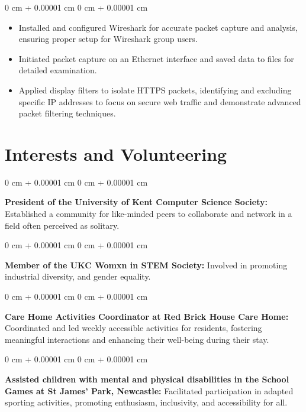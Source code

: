 \documentclass[10pt, letterpaper]{article}
\newenvironment{highlights}{
    \begin{itemize}[
        topsep=0.10 cm,
        parsep=0.10 cm,
        partopsep=0pt,
        itemsep=0pt,
        leftmargin=0 cm + 10pt
    ]
}{
    \end{itemize}
} %
\newenvironment{onecolentry}{
    \begin{adjustwidth}{
        0 cm + 0.00001 cm
    }{
        0 cm + 0.00001 cm
    }
}{
    \end{adjustwidth}
} %
\begin{document}
        \vspace{0.05 cm}
        \begin{onecolentry}
            \begin{highlights}
                \item Installed and configured Wireshark for accurate packet capture and analysis, ensuring proper setup for Wireshark group users.
                \item Initiated packet capture on an Ethernet interface and saved data to files for detailed examination.
                \item Applied display filters to isolate HTTPS packets, identifying and excluding specific IP addresses to focus on secure web traffic and demonstrate advanced packet filtering techniques.
            \end{highlights}
        \end{onecolentry}
   

 \section{Interests and Volunteering}
        
        \begin{onecolentry}
            \textbf{President of the University of Kent Computer Science Society:} Established a community for like-minded peers to collaborate and network in a field often perceived as solitary.
        \end{onecolentry}

        \vspace{0.05 cm}
        \begin{onecolentry}
            \textbf{Member of the UKC Womxn in STEM Society:} Involved in promoting industrial diversity, and gender equality.
        \end{onecolentry}

        \vspace{0.05 cm}

        \begin{onecolentry}
            \textbf{Care Home Activities Coordinator at Red Brick House Care Home:} Coordinated and led weekly accessible activities for residents, fostering meaningful interactions and enhancing their well-being during their stay. 
        \end{onecolentry}
         \vspace{0.05 cm}

        \begin{onecolentry}
            \textbf{Assisted children with mental and physical disabilities in the School Games at St James’ Park, Newcastle:} Facilitated participation in adapted sporting activities, promoting enthusiasm, inclusivity, and accessibility for all. 
        \end{onecolentry}
          \vspace{0.05 cm}
\end{document}
